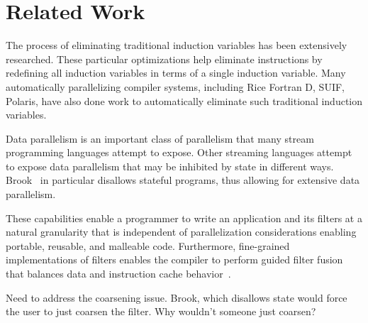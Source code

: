 \section{Related Work}
\label{sec:related}


The process of eliminating traditional induction variables has been extensively researched.  These particular optimizations help eliminate instructions by redefining all induction variables in terms of a single induction variable.  Many automatically parallelizing compiler systems, including Rice Fortran D, SUIF, Polaris, have also done work to automatically eliminate such traditional induction variables.  

%


Data parallelism is an important class of parallelism that many stream programming languages attempt to expose.  Other streaming languages attempt to expose data parallelism that may be inhibited by state in different ways.  Brook~\cite{brook04} in particular disallows stateful programs, thus allowing for extensive data parallelism.  



These capabilities enable a programmer to write an application and its
filters at a natural granularity that is independent of
parallelization considerations enabling portable, reusable, and
malleable code.  Furthermore, fine-grained implementations of filters
enables the compiler to perform guided filter fusion that balances
data and instruction cache behavior~\cite{sermulins-lctes05}.


Need to address the coarsening issue.  Brook, which disallows state
would force the user to just coarsen the filter.  Why wouldn't someone
just coarsen?  

